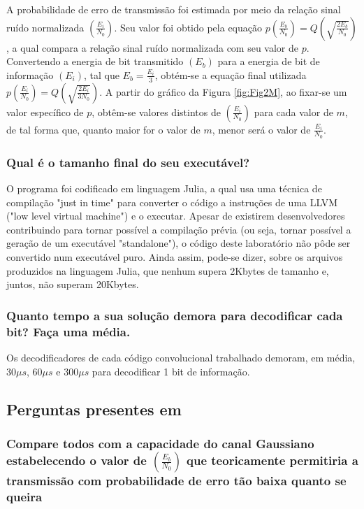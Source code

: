 A probabilidade de erro de transmissão foi estimada por meio da relação sinal ruído normalizada $(\frac{E_{i}}{N_{0}})$. Seu valor foi obtido pela equação $p\left(\frac{E_{b}}{N_{0}}\right) = Q\left(\sqrt{\frac{2E_{b}}{N_{0}}}\right)$, a qual compara a relação sinal ruído normalizada com seu valor de $p$. Convertendo a energia de bit transmitido $(E_{b})$ para a energia de bit de informação $(E_{i})$, tal que $E_{b} = \frac{E_{i}}{3}$, obtém-se a equação final utilizada $p\left(\frac{E_{i}}{N_{0}}\right) = Q\left(\sqrt{\frac{2E_{i}}{3N_{0}}}\right)$. A partir do gráfico da Figura \ref{fig:Fig2M}, ao fixar-se um valor específico de $p$, obtêm-se valores distintos de $(\frac{E_{i}}{N_{0}})$ para cada valor de $m$, de tal forma que, quanto maior for o valor de $m$, menor será o valor de $\frac{E_{i}}{N_{0}}$.  

\subsubsection{Qual é o tamanho final do seu executável?}

O programa foi codificado em linguagem Julia, a qual usa uma técnica de compilação "just in time" para converter o código a instruções de uma LLVM ("low level virtual machine") e o executar. Apesar de existirem desenvolvedores contribuindo para tornar possível a compilação prévia (ou seja, tornar possível a geração de um executável "standalone"), o código deste laboratório não pôde ser convertido num executável puro. Ainda assim, pode-se dizer, sobre os arquivos produzidos na linguagem Julia, que nenhum supera 2Kbytes de tamanho e, juntos, não superam 20Kbytes.

\subsubsection{Quanto tempo a sua solução demora para decodificar cada bit? Faça uma média.}

Os decodificadores de cada código convolucional trabalhado demoram, em média, $30 \mu s$, $60 \mu s$ e $300 \mu s$ para decodificar 1 bit de informação.

\subsection{Perguntas presentes em \cite{ref:roteiro4}}

\subsubsection{Compare todos com a capacidade do canal Gaussiano estabelecendo o valor de $(\frac{E_{b}}{N_{0}})$ que teoricamente permitiria a transmissão com probabilidade de erro tão baixa quanto se queira}

